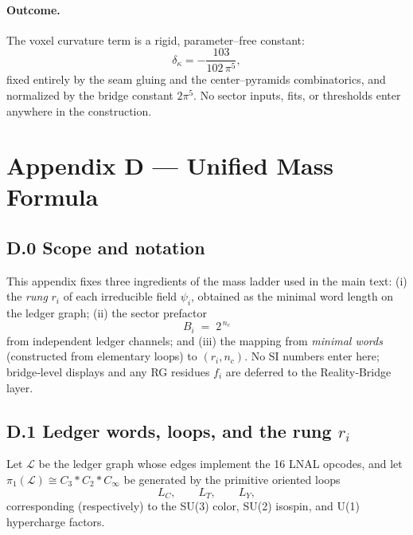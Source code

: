 \documentclass[11pt]{article}
\begin{document}
\begin{proposition}
\paragraph{Outcome.}
The voxel curvature term is a rigid, parameter–free constant:
\[
\delta_{\kappa}=-\dfrac{103}{102\,\pi^{5}},
\]
fixed entirely by the seam gluing and the center–pyramids combinatorics, and normalized by the bridge constant $2\pi^{5}$. No sector inputs, fits, or thresholds enter anywhere in the construction.%


\section*{Appendix D — Unified Mass Formula}

\subsection*{D.0  Scope and notation}
This appendix fixes three ingredients of the mass ladder used in the main text:
(i) the \emph{rung} \(r_i\) of each irreducible field \(\psi_i\), obtained as the minimal word length on the ledger graph;
(ii) the sector prefactor
\[
\boxed{\,B_i \;=\; 2^{\,n_c}\,}
\]
from independent ledger channels; and
(iii) the mapping from \emph{minimal words} (constructed from elementary loops) to \((r_i,n_c)\).
No SI numbers enter here; bridge‑level displays and any RG residues \(f_i\) are deferred to the Reality‑Bridge layer.%

\subsection*{D.1  Ledger words, loops, and the rung \(r_i\)}
Let \(\mathscr L\) be the ledger graph whose edges implement the 16 LNAL opcodes, and let
\(\pi_1(\mathscr L)\cong C_3 * C_2 * C_\infty\) be generated by the primitive oriented loops
\[
L_C,\qquad L_T,\qquad L_Y,
\]
corresponding (respectively) to the SU(3) color, SU(2) isospin, and U(1) hypercharge factors.%


\end{proposition}
\end{document}
